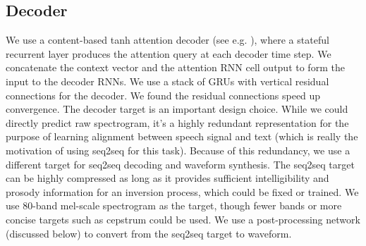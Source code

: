 \documentclass{article} \usepackage{iclr2017_conference,times}
\begin{document}
\subsection{Decoder}
We use a content-based tanh attention decoder (see e.g. \cite{vinyals2015grammar}), where a stateful recurrent layer produces the attention query at each decoder time step. We concatenate the context vector and the attention RNN cell output to form the input to the decoder RNNs. We use a stack of GRUs with vertical residual connections \citep{wu2016google} for the decoder. We found the residual connections speed up convergence. The decoder target is an important design choice. While we could directly predict raw spectrogram, it's a highly redundant representation for the purpose of learning alignment between speech signal and text (which is really the motivation of using seq2seq for this task). Because of this redundancy, we use a different target for seq2seq decoding and waveform synthesis. The seq2seq target can be highly compressed as long as it provides sufficient intelligibility and prosody information for an inversion process, which could be fixed or trained. We use 80-band mel-scale spectrogram as the target, though fewer bands or more concise targets such as cepstrum could be used. We use a post-processing network (discussed below) to convert from the seq2seq target to waveform. 
\end{document}
